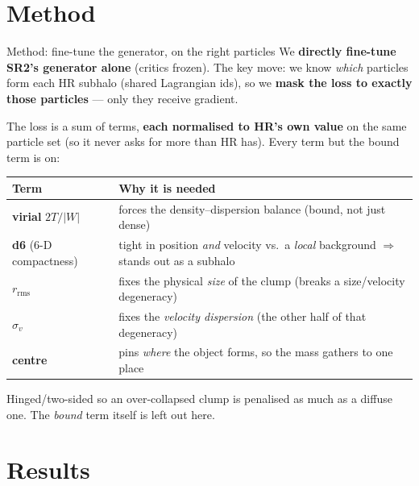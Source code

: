 \documentclass[aspectratio=169]{beamer}
\begin{document}
\section{Method}

\begin{frame}{Method: fine-tune the generator, on the right particles}
\small
We \textbf{directly fine-tune SR2's generator alone} (critics frozen). The key move: we know
\emph{which} particles form each HR subhalo (shared Lagrangian ids), so we \textbf{mask the loss to
exactly those particles} --- only they receive gradient.

\vspace{0.15cm}
The loss is a sum of terms, \textbf{each normalised to HR's own value} on the same particle set
(so it never asks for more than HR has). Every term but the bound term is on:

\vspace{0.1cm}
\centering
\begin{tabular}{l l}
\toprule
Term & Why it is needed \\
\midrule
\textbf{virial} $2T/|W|$ & forces the density--dispersion balance (bound, not just dense) \\
\textbf{d6} (6-D compactness) & tight in position \emph{and} velocity vs.\ a \emph{local} background $\Rightarrow$ stands out as a subhalo \\
\textbf{$r_{\mathrm{rms}}$} & fixes the physical \emph{size} of the clump (breaks a size/velocity degeneracy) \\
\textbf{$\sigma_v$} & fixes the \emph{velocity dispersion} (the other half of that degeneracy) \\
\textbf{centre} & pins \emph{where} the object forms, so the mass gathers to one place \\
\bottomrule
\end{tabular}

\vspace{0.2cm}
\footnotesize\textcolor{ink}{Hinged/two-sided so an over-collapsed clump is penalised as much as a diffuse one.
The \emph{bound} term itself is left out here.}
\end{frame}

\section{Results}
\end{document}
